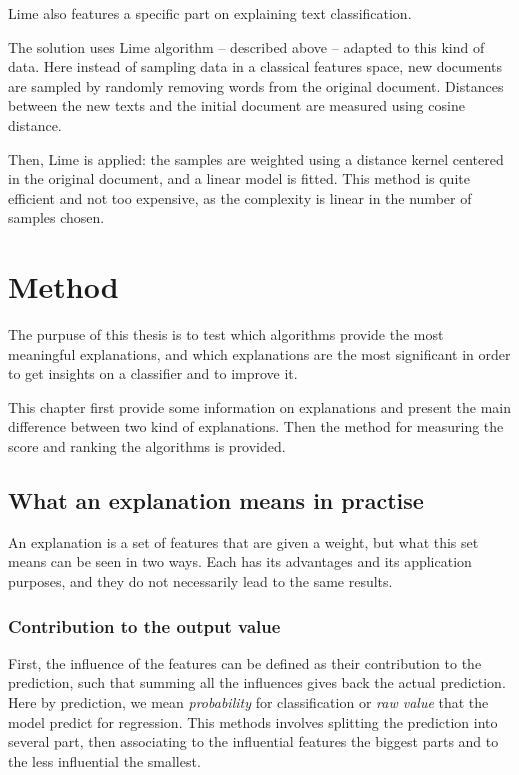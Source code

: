 \documentclass[a4paper,11pt]{kth-mag}
\begin{document}
Lime \cite{lime} also features a specific part on explaining text classification.

The solution uses Lime algorithm -- described above -- adapted to this kind of data. Here instead of sampling data in a classical features space, new documents are sampled by randomly removing words from the original document. Distances between the new texts and the initial document are measured using cosine distance.

Then, Lime is applied: the samples are weighted using a distance kernel centered in the original document, and a linear model is fitted. This method is quite efficient and not too expensive, as the complexity is linear in the number of samples chosen.

\chapter{Method}

The purpuse of this thesis is to test which algorithms provide the most meaningful explanations, and which explanations are the most significant in order to get insights on a classifier and to improve it.

This chapter first provide some information on explanations and present the main difference between two kind of explanations. Then the method for measuring the score and ranking the algorithms is provided.

\section{What an explanation means in practise}

An explanation is a set of features that are given a weight, but what this set means can be seen in two ways. Each has its advantages and its application purposes, and they do not necessarily lead to the same results.

\subsection{Contribution to the output value}

First, the influence of the features can be defined as their contribution to the prediction, such that summing all the influences gives back the actual prediction. Here by prediction, we mean \textit{probability} for classification or \textit{raw value} that the model predict for regression. This methods involves splitting the prediction into several part, then associating to the influential features the biggest parts and to the less influential the smallest.
\end{document}
